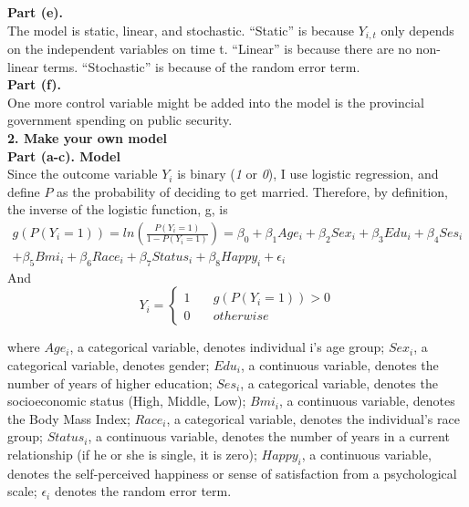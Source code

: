 \documentclass[letterpaper,12pt]{article}
\theoremstyle{definition}
\begin{document}
\textbf{Part (e).} \\

The model is static, linear, and stochastic. ``Static'' is because $Y_{i,t}$ only depends on the independent variables on time t. ``Linear'' is because there are no non-linear terms. ``Stochastic'' is because of the random error term. \\

\textbf{Part (f).} \\

One more control variable might be added into the model is the provincial government spending on public security. \\

\noindent\textbf{2. Make your own model} \\

\textbf{Part (a-c). Model} \\

Since the outcome variable $Y_{i}$ is binary (\emph{1} or \emph{0}), I use logistic regression, and define $P$ as the probability of deciding to get married. Therefore, by definition, the inverse of the logistic function, g, is
\begin{equation*}
\begin{aligned}
g(P(Y_{i}=1)) = ln(\frac{P(Y_{i}=1)}{1-P(Y_{i}=1)}) 
        = \beta_{0} + \beta_{1} Age_{i} + \beta_{2} Sex_{i} + \beta_{3} Edu_{i} + \beta_{4} Ses_{i} \\ + \beta_{5} Bmi_{i} 
        + \beta_{6} Race_{i} + \beta_{7} Status_{i} +  \beta_{8} Happy_{i} + \epsilon_{i}
\end{aligned}
\end{equation*}
And 
\begin{equation}
Y_{i} = \left\{
\begin{array}{ll}
1 & \quad g(P(Y_{i}=1)) > 0 \\
0 & \quad otherwise
\end{array}
\right.
\end{equation}

 where $Age_{i}$, a categorical variable, denotes individual i's age group; $Sex_{i}$, a categorical variable, denotes gender; $Edu_{i}$, a continuous variable, denotes the number of years of higher education; $Ses_{i}$, a categorical variable, denotes the socioeconomic status (High, Middle, Low); $Bmi_{i}$, a continuous variable, denotes the Body Mass Index; $Race_{i}$, a categorical variable, denotes the individual's race group; $Status_{i}$, a continuous variable, denotes the number of years in a current relationship (if he or she is single, it is zero); $Happy_{i}$, a continuous variable, denotes the self-perceived happiness or sense of satisfaction from a psychological scale; $\epsilon_{i}$ denotes the random error term. \\
\end{document}
